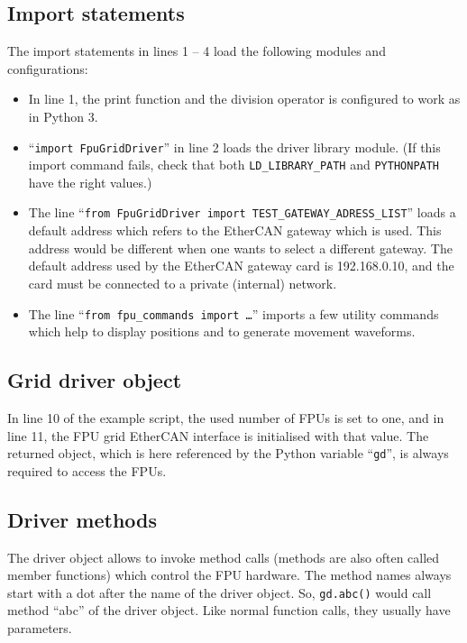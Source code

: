 \documentclass[11pt,a4paper]{scrartcl}
\begin{document}
\subsection{Import statements}

The import statements in lines 1 -- 4 load the following modules and
configurations:

\begin{itemize}
\item In line 1, the print function and the division operator is
  configured to work as in Python 3.
  
\item ``\texttt{import FpuGridDriver}'' in line 2 loads the driver
  library module. (If this import command fails, check that both
  \verb+LD_LIBRARY_PATH+ and \verb+PYTHONPATH+ have the right values.)

\item The line ``\texttt{from FpuGridDriver import
  TEST\_GATEWAY\_ADRESS\_LIST}'' loads a default address which refers to
  the EtherCAN gateway which is used. This address would be different
  when one wants to select a different gateway. The default
  address used by the EtherCAN gateway card is 192.168.0.10,
  and the card must be connected to a private (internal) network.

\item The line ``\texttt{from fpu\_commands import \ldots}'' imports a
  few utility commands which help to display positions and to generate
  movement waveforms.

 
\end{itemize}

\subsection{Grid driver object}

In line 10 of the example script, the used number of FPUs is set to
one, and in line 11, the FPU grid EtherCAN interface is initialised with that
value. The returned object, which is here referenced by the Python variable
``\texttt{gd}'', is always required to access the FPUs.

\subsection{Driver methods}
The driver object allows to invoke method calls (methods are also
often called member functions) which control the FPU hardware. The
method names always start with a dot after the name of the driver
object.  So, \texttt{gd.abc()} would call method ``abc'' of the driver
object. Like normal function calls, they usually have parameters.
\end{document}
